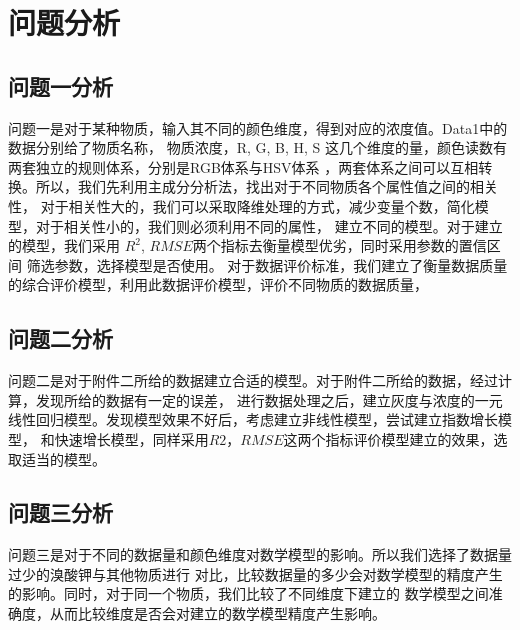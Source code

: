 \section{问题分析}
\subsection{问题一分析}
问题一是对于某种物质，输入其不同的颜色维度，得到对应的浓度值。Data1中的数据分别给了物质名称，
物质浓度，R, G, B, H, S 这几个维度的量，颜色读数有两套独立的规则体系，分别是RGB体系与HSV体系
，两套体系之间可以互相转换。所以，我们先利用主成分分析法，找出对于不同物质各个属性值之间的相关性，
对于相关性大的，我们可以采取降维处理的方式，减少变量个数，简化模型，对于相关性小的，我们则必须利用不同的属性，
建立不同的模型。对于建立的模型，我们采用 $R^2$, $RMSE$两个指标去衡量模型优劣，同时采用参数的置信区间
筛选参数，选择模型是否使用。
对于数据评价标准，我们建立了衡量数据质量的综合评价模型，利用此数据评价模型，评价不同物质的数据质量，

\subsection{问题二分析}
问题二是对于附件二所给的数据建立合适的模型。对于附件二所给的数据，经过计算，发现所给的数据有一定的误差，
进行数据处理之后，建立灰度与浓度的一元线性回归模型。发现模型效果不好后，考虑建立非线性模型，尝试建立指数增长模型，
和快速增长模型，同样采用$R2$，$RMSE$这两个指标评价模型建立的效果，选取适当的模型。

\subsection{问题三分析}
问题三是对于不同的数据量和颜色维度对数学模型的影响。所以我们选择了数据量过少的溴酸钾与其他物质进行
对比，比较数据量的多少会对数学模型的精度产生的影响。同时，对于同一个物质，我们比较了不同维度下建立的
数学模型之间准确度，从而比较维度是否会对建立的数学模型精度产生影响。
